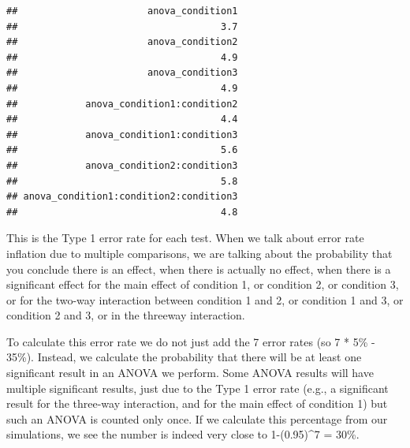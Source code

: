 \documentclass[]{book}
\newenvironment{Shaded}{\begin{snugshade}}{\end{snugshade}}
\newcommand{\ControlFlowTok}[1]{\textcolor[rgb]{0.13,0.29,0.53}{\textbf{#1}}}
\newcommand{\DecValTok}[1]{\textcolor[rgb]{0.00,0.00,0.81}{#1}}
\newcommand{\KeywordTok}[1]{\textcolor[rgb]{0.13,0.29,0.53}{\textbf{#1}}}
\newcommand{\NormalTok}[1]{#1}
\newcommand{\OperatorTok}[1]{\textcolor[rgb]{0.81,0.36,0.00}{\textbf{#1}}}
\newcommand{\StringTok}[1]{\textcolor[rgb]{0.31,0.60,0.02}{#1}}
\begin{document}
\begin{verbatim}
##                       anova_condition1 
##                                    3.7 
##                       anova_condition2 
##                                    4.9 
##                       anova_condition3 
##                                    4.9 
##            anova_condition1:condition2 
##                                    4.4 
##            anova_condition1:condition3 
##                                    5.6 
##            anova_condition2:condition3 
##                                    5.8 
## anova_condition1:condition2:condition3 
##                                    4.8
\end{verbatim}

This is the Type 1 error rate for each test. When we talk about error rate inflation due to multiple comparisons, we are talking about the probability that you conclude there is an effect, when there is actually no effect, when there is a significant effect for the main effect of condition 1, or condition 2, or condition 3, or for the two-way interaction between condition 1 and 2, or condition 1 and 3, or condition 2 and 3, or in the threeway interaction.

To calculate this error rate we do not just add the 7 error rates (so 7 * 5\% - 35\%). Instead, we calculate the probability that there will be at least one significant result in an ANOVA we perform. Some ANOVA results will have multiple significant results, just due to the Type 1 error rate (e.g., a significant result for the three-way interaction, and for the main effect of condition 1) but such an ANOVA is counted only once. If we calculate this percentage from our simulations, we see the number is indeed very close to 1-(0.95)\^{}7 = 30\%.

\begin{Shaded}
\end{Shaded}
\end{document}
